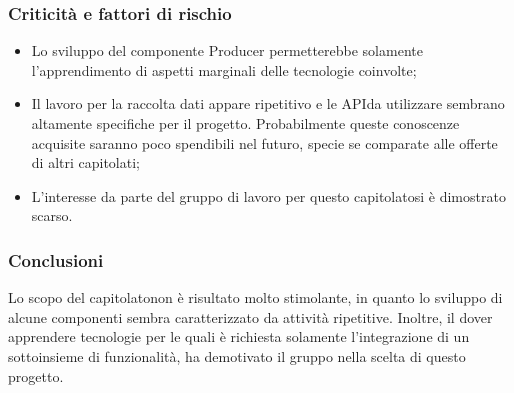 \subsubsection{Criticità e fattori di rischio}
\begin{itemize}
	\item Lo sviluppo del componente Producer permetterebbe solamente l'apprendimento di aspetti marginali delle tecnologie coinvolte;
	\item Il lavoro per la raccolta dati appare ripetitivo 
	 e le API\glosp da utilizzare sembrano altamente specifiche per il progetto. Probabilmente queste conoscenze acquisite saranno poco spendibili nel futuro, specie se comparate alle offerte di altri capitolati;
	\item L'interesse da parte del gruppo di lavoro per questo capitolato\glosp si è dimostrato scarso.
\end{itemize}

\subsubsection{Conclusioni}
Lo scopo del capitolato\glosp non è risultato molto stimolante, in quanto lo
sviluppo di alcune componenti sembra caratterizzato da attività ripetitive.
Inoltre, il dover apprendere tecnologie per le quali è richiesta solamente 
l'integrazione di un sottoinsieme di funzionalità, ha demotivato il gruppo nella scelta di questo progetto.
